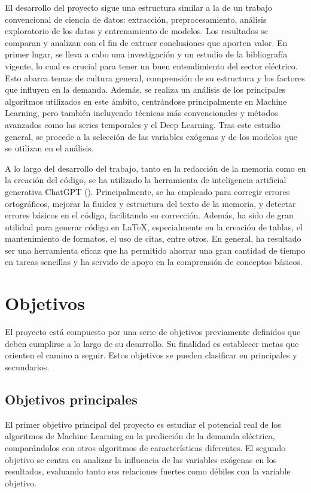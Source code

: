 \documentclass[12pt,a4paper]{report}
\begin{document}
El desarrollo del proyecto sigue una estructura similar a la de un trabajo convencional de ciencia de datos: extracción, preprocesamiento, análisis exploratorio de los datos y entrenamiento de modelos. Los resultados se comparan y analizan con el fin de extraer conclusiones que aporten valor. En primer lugar, se lleva a cabo una investigación y un estudio de la bibliografía vigente, lo cual es crucial para tener un buen entendimiento del sector eléctrico. Esto abarca temas de cultura general, comprensión de su estructura y los factores que influyen en la demanda. Además, se realiza un análisis de los principales algoritmos utilizados en este ámbito, centrándose principalmente en Machine Learning, pero también incluyendo técnicas más convencionales y métodos avanzados como las series temporales y el Deep Learning. Tras este estudio general, se procede a la selección de las variables exógenas y de los modelos que se utilizan en el análisis.

A lo largo del desarrollo del trabajo, tanto en la redacción de la memoria como en la creación del código, se ha utilizado la herramienta de inteligencia artificial generativa ChatGPT (\cite{chatgpt}). Principalmente, se ha empleado para corregir errores ortográficos, mejorar la fluidez y estructura del texto de la memoria, y detectar errores básicos en el código, facilitando su corrección. Además, ha sido de gran utilidad para generar código en \LaTeX, especialmente en la creación de tablas, el mantenimiento de formatos, el uso de citas, entre otros. En general, ha resultado ser una herramienta eficaz que ha permitido ahorrar una gran cantidad de tiempo en tareas sencillas y ha servido de apoyo en la comprensión de conceptos básicos.

\section{Objetivos}

El proyecto está compuesto por una serie de objetivos previamente definidos que deben cumplirse a lo largo de su desarrollo. Su finalidad es establecer metas que orienten el camino a seguir. Estos objetivos se pueden clasificar en principales y secundarios.

\subsection{Objetivos principales}

El primer objetivo principal del proyecto es estudiar el potencial real de los algoritmos de Machine Learning en la predicción de la demanda eléctrica, comparándolos con otros algoritmos de características diferentes. El segundo objetivo se centra en analizar la influencia de las variables exógenas en los resultados, evaluando tanto sus relaciones fuertes como débiles con la variable objetivo.
\end{document}
